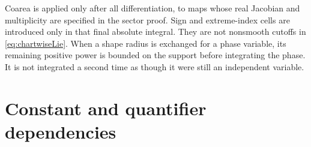 \documentclass[11pt]{article}
\numberwithin{equation}{section}
\theoremstyle{definition}
\begin{document}
Coarea is applied only after all differentiation, to maps whose
real Jacobian and multiplicity are specified in the sector proof.
Sign and extreme-index cells are introduced only in that final
absolute integral. They are not nonsmooth cutoffs in
\eqref{eq:chartwiseLie}. When a shape radius is exchanged for a
phase variable, its remaining positive power is bounded on the
support before integrating the phase. It is not integrated a
second time as though it were still an independent variable.



\section{Constant and quantifier dependencies}\label{app:constants}
\end{document}
